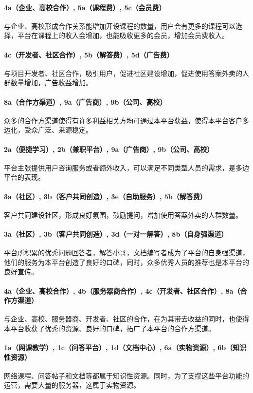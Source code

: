 \documentclass[a4paper]{ctexart}
\begin{document}
\paragraph{4a（企业、高校合作）, 5a（课程费）, 5c（会员费）}与企业、高校形成合作关系能增加开设课程的数量，用户会有更多的课程可以选择，平台在课程上的收入会增加，也能吸收更多的会员，增加会员费收入。
\paragraph{4c（开发者、社区合作）, 5b（解答费）, 5d（广告费）}与项目开发者、社区合作，吸引用户，促进社区建设增加，促进使用答案外卖的人群数量增加，广告收益增加。
\paragraph{8a（合作方渠道）, 9a（广告商）, 9b（公司、高校）}众多的合作方渠道使得有许多利益相关方均可通过本平台获益，使得本平台客户多边化，受众广泛、来源稳定。
\paragraph{2a（便捷学习）, 2b（兼职平台）, 9a（广告商）, 9b（公司、高校）}平台主张提供用户咨询服务或者额外收入，可以满足不同类型人员的需求，是多边平台的表现。
\paragraph{3a（社区）, 3b（客户共同创造）, 3e（自助服务）, 5b（解答费）}客户共同建设社区，形成良好氛围，鼓励提问，增加使用答案外卖的人群数量。
\paragraph{3a（社区）, 3b（客户共同创造）, 3d（一对一解答）, 8b（自身强渠道）}平台所积累的优秀问题回答者，解答小哥，文档编写者成为了平台的自身强渠道，他们的服务为本平台创造了良好的口碑，同时，众多优秀人员的推荐也是本平台的良好宣传。
\paragraph{4a（企业、高校合作）, 4b（服务器商合作）, 4c（开发者、社区合作）, 8a（合作方渠道）}与企业、高校、服务器商、开发者、社区的合作，在为其带去收益的同时，也使得本平台收获了优秀的资源、良好的口碑，拓广了本平台的合作方渠道。
\paragraph{1a（网课教学）, 1c（问答平台）, 1d（文档中心）, 6a（实物资源）, 6b（知识性资源）}网络课程、问答帖子和文档等都属于知识性资源。同时，为了支撑这些平台功能的运营，需要大量的服务器，这属于实物资源。
\end{document}
